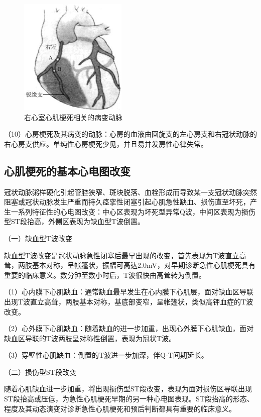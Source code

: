 \begin{figure}[!htbp]
 \centering
 \includegraphics[width=2.02083in,height=2.19792in]{./images/Image00714.jpg}
 \captionsetup{justification=centering}
 \caption{右心室心肌梗死相关的病变动脉}
 \label{fig44-6}
  \end{figure} 

（10）心房梗死及其病变的动脉：心房的血液由回旋支的左心房支和右冠状动脉的右心房支供应。单纯性心房梗死少见，并且易并发房性心律失常。

\protect\hypertarget{text00052.htmlux5cux23subid624}{}{}

\subsection{心肌梗死的基本心电图改变}

冠状动脉粥样硬化引起管腔狭窄、斑块脱落、血栓形成而导致某一支冠状动脉突然阻塞或冠状动脉发生严重而持久痉挛性闭塞引起心肌急性缺血、损伤直至坏死，产生一系列特征性的心电图改变：中心区表现为坏死型异常Q波，中间区表现为损伤型ST段抬高，外侧区表现为缺血型T波倒置。

（一）缺血型T波改变

缺血型T波改变是冠状动脉急性闭塞后最早出现的改变，首先表现为T波直立高耸，两肢基本对称，呈帐篷状，振幅可高达2.0mV，对早期诊断急性心肌梗死具有重要的临床意义。数分钟至数小时后，T波很快由高耸转为倒置。

（1）心内膜下心肌缺血：通常缺血最早发生在心内膜下心肌层，面对缺血区导联出现T波直立高耸，两肢基本对称，基底部变窄，呈帐篷状，类似高钾血症的T波改变。

（2）心外膜下心肌缺血：随着缺血的进一步加重，出现心外膜下心肌缺血，面对缺血区导联的T波两肢呈对称性倒置，表现为冠状T波。

（3）穿壁性心肌缺血：倒置的T波进一步加深，伴Q-T间期延长。

（二）损伤型ST段改变

随着心肌缺血进一步加重，将出现损伤型ST段改变，表现为面对损伤区导联出现ST段抬高或压低，为急性心肌梗死早期的另一种心电图表现。ST段抬高的形态、程度及其动态演变对诊断急性心肌梗死和预后判断都具有重要的临床意义。

